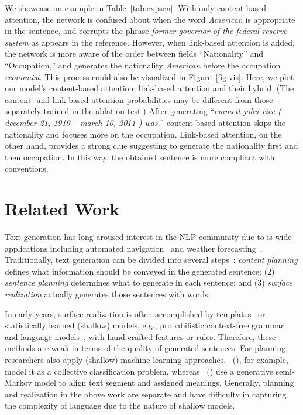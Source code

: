 \documentclass[letterpaper]{article} %
\newcommand{\newcite}[1]{\citeauthor{#1}~(\citeyear{#1})}
\begin{document}
We showcase an example in Table~\ref{tab:expsen}. With only content-based attention, the network is confused about when the word \textit{American} is appropriate in the sentence, and corrupts the phrase \textit{former governor of the federal reserve system} as appears in the reference. However, when link-based attention is added, the network is more aware of the order between fields ``Nationality'' and ``Occupation,'' and generates the nationality \textit{American} before the occupation \textit{economist}. This process could also be visualized in Figure~\ref{fig:vis}. Here, we plot our model's content-based attention, link-based attention and their hybrid. (The content- and link-based attention probabilities may be different from those separately trained in the ablation test.) After generating ``\textit{emmett john rice ( december 21, 1919 -- march 10, 2011 ) was},'' content-based attention skips the nationality and focuses more on the occupation. Link-based attention, on the other hand, provides a strong clue suggesting to generate the nationality first and then occupation. In this way, the obtained sentence is more compliant with conventions.






\section{Related Work}

Text generation has long aroused interest in the NLP community due to is wide applications including automated navigation~\cite{navigate} and weather forecasting~\cite{weather}. Traditionally, text generation can be divided into several steps~\cite{NLG}: \textit{content planning} defines what information should be conveyed in the generated sentence; (2) \textit{sentence planning} determines what to generate in each sentence; and (3) \textit{surface realization} actually generates those sentences with words.

In early years, surface realization is often accomplished by templates~\cite{template} or statistically learned (shallow) models, e.g., probabilistic context-free grammar~\cite{pcfg} and language models~\cite{LM}, with hand-crafted features or rules. Therefore, these methods are weak in terms of the quality of generated sentences. For planning, researchers also apply (shallow) machine learning approaches. \newcite{collective}, for example, model it as a collective classification problem, whereas \newcite{semimarkov} use a generative semi-Markov model to align text segment and assigned meanings. Generally, planning and realization in the above work are separate and have difficulty in capturing the complexity of language due to the nature of shallow models.
\end{document}

